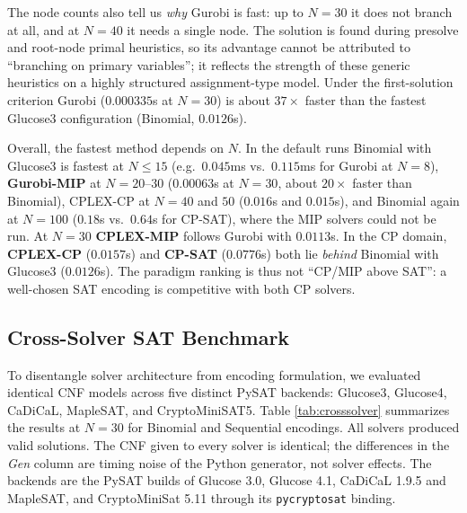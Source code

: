 \documentclass[a4paper,fleqn]{cas-sc}
\begin{document}
The node counts also tell us \emph{why} Gurobi is fast: up to $N=30$ it does not branch at all, and at $N=40$ it needs a single node. The solution is found during presolve and root-node primal heuristics, so its advantage cannot be attributed to ``branching on primary variables''; it reflects the strength of these generic heuristics on a highly structured assignment-type model. Under the first-solution criterion Gurobi ($0.000335$s at $N=30$) is about $37\times$ faster than the fastest Glucose3 configuration (Binomial, $0.0126$s).

Overall, the fastest method depends on $N$. In the default runs Binomial with Glucose3 is fastest at $N \leq 15$ (e.g.\ $0.045$ms vs.\ $0.115$ms for Gurobi at $N=8$), \textbf{Gurobi-MIP} at $N = 20$--$30$ ($0.00063$s at $N=30$, about $20\times$ faster than Binomial), CPLEX-CP at $N = 40$ and $50$ ($0.016$s and $0.015$s), and Binomial again at $N=100$ ($0.18$s vs.\ $0.64$s for CP-SAT), where the MIP solvers could not be run. At $N=30$ \textbf{CPLEX-MIP} follows Gurobi with $0.0113$s. In the CP domain, \textbf{CPLEX-CP} ($0.0157$s) and \textbf{CP-SAT} ($0.0776$s) both lie \emph{behind} Binomial with Glucose3 ($0.0126$s). The paradigm ranking is thus not ``CP/MIP above SAT'': a well-chosen SAT encoding is competitive with both CP solvers.

\subsection{Cross-Solver SAT Benchmark}
To disentangle solver architecture from encoding formulation, we evaluated identical CNF models across five distinct PySAT backends: Glucose3, Glucose4, CaDiCaL, MapleSAT, and CryptoMiniSAT5. Table \ref{tab:crosssolver} summarizes the results at $N=30$ for Binomial and Sequential encodings. All solvers produced valid solutions. The CNF given to every solver is identical; the differences in the \emph{Gen} column are timing noise of the Python generator, not solver effects. The backends are the PySAT builds of Glucose 3.0, Glucose 4.1, CaDiCaL 1.9.5 and MapleSAT, and CryptoMiniSat 5.11 through its \texttt{pycryptosat} binding.
\end{document}
